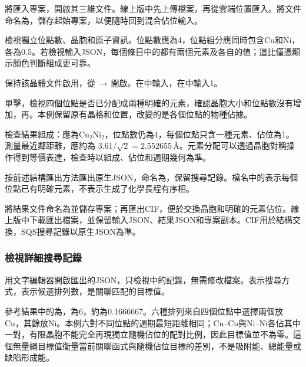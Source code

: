 \begin{steps}
  \item 將匯入專案，開啟其三維文件。線上版中先上傳檔案，再從雲端位置匯入。將文件命名為，儲存起始專案，以便隨時回到混合佔位輸入。
  \item 檢視獨立位點數、晶胞和原子資訊。位點數應為4，位點組分應同時包含Cu和Ni，各為0.5。若檢視輸入JSON，每個條目中的都有兩個元素及各自的值；這比僅憑顯示顏色判斷組成更可靠。
  \item 保持該晶體文件啟用，從\,$\rightarrow$\,開啟。在中輸入，在中輸入1。
  \item 單擊，檢視四個位點是否已分配成兩種明確的元素，確認晶胞大小和位點數沒有增加，再。本例保留原有晶格和位置，改變的是各個位點的物種佔據。
  \item 檢查結果組成：應為Cu$_2$Ni$_2$，位點數仍為4，每個位點只含一種元素、佔位為1。測量最近鄰距離，應約為 $3.61/\sqrt{2}=2.552655\,\text{\AA}$。元素分配可以透過晶胞對稱操作得到等價表達，檢查時以組成、佔位和週期幾何為準。
  \item 按前述結構匯出方法匯出原生JSON，命名為，保留搜尋記錄。檔名中的表示每個位點已有明確元素，不表示生成了化學長程有序相。
  \item 將結果文件命名為並儲存專案；再匯出CIF，便於交換晶胞和明確的元素佔位。線上版中下載匯出檔案，並保留輸入JSON、結果JSON和專案副本。CIF用於結構交換，SQS搜尋記錄以原生JSON為準。
\end{steps}

\subsubsection*{檢視詳細搜尋記錄}

用文字編輯器開啟匯出的JSON，只檢視中的記錄，無需修改檔案。表示搜尋方式，表示候選排列數，是關聯匹配的目標值。

參考結果中的為，為6，約為0.1666667。六種排列來自四個位點中選擇兩個放Cu，其餘放Ni。本例六對不同位點的週期最短距離相同；Cu--Cu與Ni--Ni各佔其中一對，有限晶胞不能完全再現獨立隨機佔位的配對比例，因此目標值並不為零。這個無量綱目標值衡量當前關聯函式與隨機佔位目標的差別，不是吸附能、總能量或缺陷形成能。

